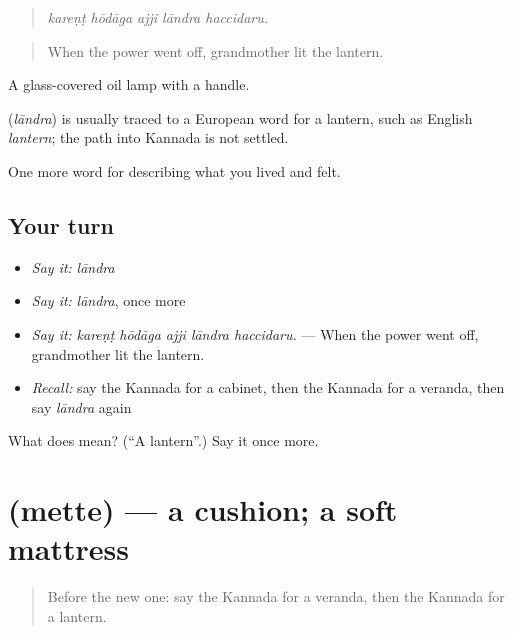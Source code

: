 \begin{quote}
\emph{kareṇṭ hōdāga ajji lāndra haccidaru.}
\end{quote}

\begin{quote}
When the power went off, grandmother lit the lantern.
\end{quote}

A glass-covered oil lamp with a handle.

\begin{cousinweb}
\textbf{} (\emph{lāndra}) is usually traced to a European word for a lantern, such as English \emph{lantern}; the path into Kannada is not settled.
\end{cousinweb}

\begin{grammarlens}[title={What you've built}]
One more word for describing what you lived and felt.
\end{grammarlens}

\subsection*{Your turn}
\begin{itemize}
\raggedright
  \item \emph{Say it:} \emph{lāndra}
  \item \emph{Say it:} \emph{lāndra}, once more
  \item \emph{Say it:} \emph{kareṇṭ hōdāga ajji lāndra haccidaru.} — When the power went off, grandmother lit the lantern.
  \item \emph{Recall:} say the Kannada for a cabinet, then the Kannada for a veranda, then say \emph{lāndra} again
\end{itemize}

\begin{tcolorbox}[breakable,colback=teal!4,colframe=teal!35!black,title={Before you move on}]
What does  mean? (\textquotedblleft{}A lantern\textquotedblright{}.) Say it once more.
\end{tcolorbox}
\section[\texorpdfstring{\kn{ಮೆತ್ತೆ} (mette)}{ಮೆತ್ತೆ (mette)}]{ (mette) — a cushion; a soft mattress}

\label{lesson:KA-C543-mette}



\begin{quote}
Before the new one: say the Kannada for a veranda, then the Kannada for a lantern.
\end{quote}

